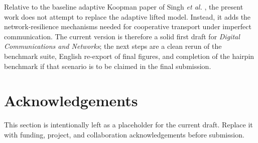 \documentclass[twocolumn,3p,times,procedia]{elsarticle}
\begin{document}
Relative to the baseline adaptive Koopman paper of Singh \emph{et al.} \cite{singh2024adaptive}, the present work does not attempt to replace the adaptive lifted model. Instead, it adds the network-resilience mechanisms needed for cooperative transport under imperfect communication. The current version is therefore a solid first draft for \emph{Digital Communications and Networks}; the next steps are a clean rerun of the benchmark suite, English re-export of final figures, and completion of the hairpin benchmark if that scenario is to be claimed in the final submission.

\section*{Acknowledgements}
This section is intentionally left as a placeholder for the current draft. Replace it with funding, project, and collaboration acknowledgements before submission.


\balance

\end{document}
